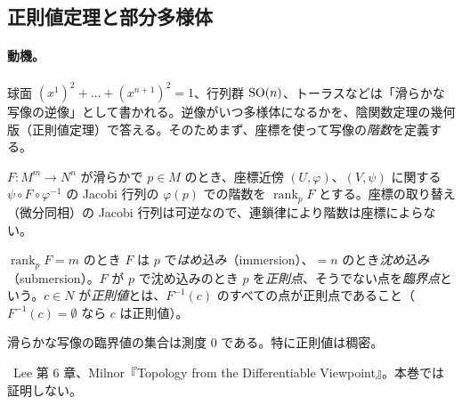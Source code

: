 \subsection{正則値定理と部分多様体}\label{A:sub:regval}
\paragraph{動機。}球面 $(x^1)^2+\dots+(x^{n+1})^2=1$、行列群 $\mathrm{SO}(n)$、トーラスなどは「滑らかな写像の逆像」として書かれる。逆像がいつ多様体になるかを、陰関数定理の幾何版（正則値定理）で答える。そのためまず、座標を使って写像の\emph{階数}を定義する。

$F:M^m\to N^n$ が滑らかで $p\in M$ のとき、座標近傍 $(U,\varphi)$、$(V,\psi)$ に関する $\psi\circ F\circ\varphi^{-1}$ の Jacobi 行列の $\varphi(p)$ での階数を $\operatorname{rank}_pF$ とする。座標の取り替え（微分同相）の Jacobi 行列は可逆なので、連鎖律により階数は座標によらない。

\begin{defn}
$\operatorname{rank}_pF=m$ のとき $F$ は $p$ で\emph{はめ込み}（immersion）、$=n$ のとき\emph{沈め込み}（submersion）。$F$ が $p$ で沈め込みのとき $p$ を\emph{正則点}、そうでない点を\emph{臨界点}という。$c\in N$ が\emph{正則値}とは、$F^{-1}(c)$ のすべての点が正則点であること（$F^{-1}(c)=\emptyset$ なら $c$ は正則値）。
\end{defn}

\begin{thm}
滑らかな写像の臨界値の集合は測度 $0$ である。特に正則値は稠密。
\end{thm}
\tC\ Lee 第 6 章、Milnor『Topology from the Differentiable Viewpoint』。本巻では証明しない。

